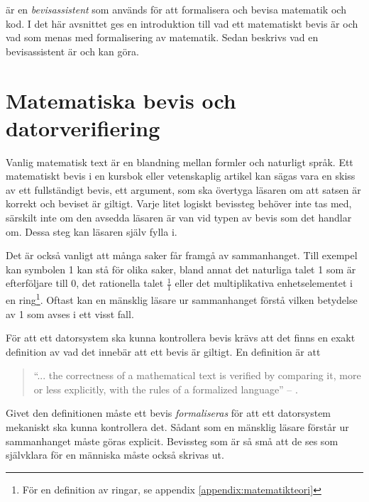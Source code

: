 \coq{} är en \emph{bevisassistent} som används för att formalisera och bevisa
matematik och kod.
I det här avsnittet ges en introduktion till vad ett matematiskt bevis är och vad som menas med
formalisering av matematik. Sedan beskrivs vad en bevisassistent är och kan
göra.

\section{Matematiska bevis och datorverifiering}
Vanlig matematisk text är en blandning mellan formler och naturligt språk. Ett
matematiskt bevis i en kursbok eller vetenskaplig artikel kan sägas vara en
skiss av ett fullständigt bevis, ett argument, som ska övertyga läsaren om att
satsen är korrekt och beviset är giltigt. Varje litet logiskt bevissteg behöver
inte tas med, särskilt inte om den avsedda läsaren är van vid typen av bevis
som det handlar om. Dessa steg kan läsaren själv fylla i.


Det är också vanligt att många saker får framgå av sammanhanget.
Till
exempel kan symbolen 1 kan stå för olika saker, bland annat det naturliga talet
1 som är efterföljare till 0, det rationella talet $\frac{1}{1}$ eller det
multiplikativa enhetselementet i en ring\footnote{För en definition av ringar,
se appendix \ref{appendix:matematikteori}}. Oftast kan en mänsklig läsare ur
sammanhanget förstå vilken betydelse av 1 som avses i ett visst fall.

För att ett datorsystem ska kunna kontrollera bevis krävs att det finns en
exakt definition av vad det innebär att ett bevis är giltigt. En definition är
att
\begin{quote}
``... the correctness of a mathematical text is verified by comparing it, more or
less explicitly, with the rules of a formalized language'' -- \cite{bourbaki1968sets}.
\end{quote}

Givet den definitionen måste ett bevis \emph{formaliseras} för att ett
datorsystem mekaniskt ska kunna kontrollera det. Sådant som en mänsklig läsare
förstår ur sammanhanget måste göras explicit. Bevissteg som är så små att de
ses som självklara för en människa måste också skrivas ut.

